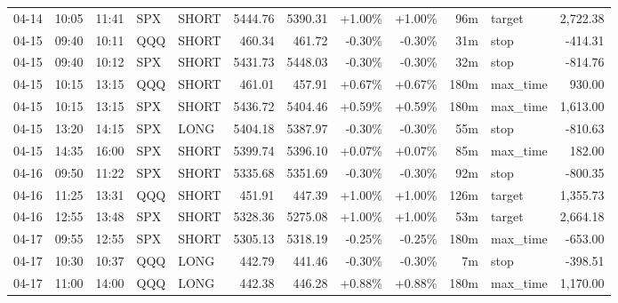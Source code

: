 \documentclass[11pt,a4paper,twoside]{article}
\begin{document}
\begin{center}
\begin{longtable}{>{\color{txtmain}}l l l l l r r r r r >{\color{txtmain}}l r}
04-14 & 10:05 & 11:41 & SPX & SHORT & 5444.76 & 5390.31 & \textcolor{wingreen}{+1.00\%} & \textcolor{wingreen}{+1.00\%} & 96m & target & \textcolor{wingreen}{2,722.38} \\
04-15 & 09:40 & 10:11 & QQQ & SHORT & 460.34 & 461.72 & \textcolor{lossred}{-0.30\%} & \textcolor{lossred}{-0.30\%} & 31m & stop & \textcolor{lossred}{-414.31} \\
04-15 & 09:40 & 10:12 & SPX & SHORT & 5431.73 & 5448.03 & \textcolor{lossred}{-0.30\%} & \textcolor{lossred}{-0.30\%} & 32m & stop & \textcolor{lossred}{-814.76} \\
04-15 & 10:15 & 13:15 & QQQ & SHORT & 461.01 & 457.91 & \textcolor{wingreen}{+0.67\%} & \textcolor{wingreen}{+0.67\%} & 180m & max\_time & \textcolor{wingreen}{930.00} \\
04-15 & 10:15 & 13:15 & SPX & SHORT & 5436.72 & 5404.46 & \textcolor{wingreen}{+0.59\%} & \textcolor{wingreen}{+0.59\%} & 180m & max\_time & \textcolor{wingreen}{1,613.00} \\
04-15 & 13:20 & 14:15 & SPX & LONG & 5404.18 & 5387.97 & \textcolor{lossred}{-0.30\%} & \textcolor{lossred}{-0.30\%} & 55m & stop & \textcolor{lossred}{-810.63} \\
04-15 & 14:35 & 16:00 & SPX & SHORT & 5399.74 & 5396.10 & \textcolor{wingreen}{+0.07\%} & \textcolor{wingreen}{+0.07\%} & 85m & max\_time & \textcolor{wingreen}{182.00} \\
04-16 & 09:50 & 11:22 & SPX & SHORT & 5335.68 & 5351.69 & \textcolor{lossred}{-0.30\%} & \textcolor{lossred}{-0.30\%} & 92m & stop & \textcolor{lossred}{-800.35} \\
04-16 & 11:25 & 13:31 & QQQ & SHORT & 451.91 & 447.39 & \textcolor{wingreen}{+1.00\%} & \textcolor{wingreen}{+1.00\%} & 126m & target & \textcolor{wingreen}{1,355.73} \\
04-16 & 12:55 & 13:48 & SPX & SHORT & 5328.36 & 5275.08 & \textcolor{wingreen}{+1.00\%} & \textcolor{wingreen}{+1.00\%} & 53m & target & \textcolor{wingreen}{2,664.18} \\
04-17 & 09:55 & 12:55 & SPX & SHORT & 5305.13 & 5318.19 & \textcolor{lossred}{-0.25\%} & \textcolor{lossred}{-0.25\%} & 180m & max\_time & \textcolor{lossred}{-653.00} \\
04-17 & 10:30 & 10:37 & QQQ & LONG & 442.79 & 441.46 & \textcolor{lossred}{-0.30\%} & \textcolor{lossred}{-0.30\%} & 7m & stop & \textcolor{lossred}{-398.51} \\
04-17 & 11:00 & 14:00 & QQQ & LONG & 442.38 & 446.28 & \textcolor{wingreen}{+0.88\%} & \textcolor{wingreen}{+0.88\%} & 180m & max\_time & \textcolor{wingreen}{1,170.00} \\

\end{longtable}
\end{center}
\end{document}
